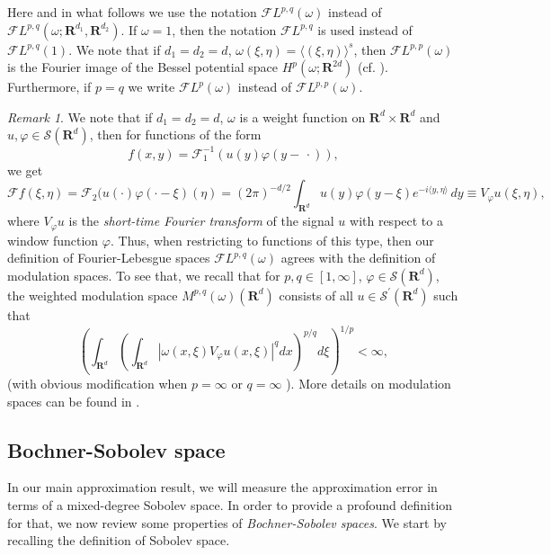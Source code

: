 \documentclass[a4paper]{article}
\newcommand{\rr}[1]{\mathbf{R}^{#1}}
\newcommand{\rrI}{\rr{d_1}}
\newcommand{\rrII}{\rr{d_2}}
\newcommand{\scal}[2]{\langle #1,#2\rangle}
\newcommand{\eabs}[1]{\langle #1\rangle}     %
\numberwithin{equation}{section}
\theoremstyle{remark}
\newtheorem{remark}[theorem]{Remark}
\begin{document}
Here and in what follows we use the notation
$\mathscr F L^{p, q}(\omega)$ instead of
$\mathscr F L^{p, q}(\omega; \rrI,\rrII)$.
If $\omega =1$, then the notation $\mathscr FL^{p, q}$
is used instead of $\mathscr FL^{p, q}(1 )$.
We note that if $d_1=d_2 = d$,
$\omega (\xi , \eta)=\eabs {(\xi, \eta)} ^s$,
then
$\mathscr{F}L^{p, p}(\omega )$ is the Fourier image of the Bessel potential space
$H^p(\omega ; \rr{2d})$
(cf. \cite{Bergh76InterpolationSpacesIntroduction}).
Furthermore, if $p=q$ we write $\mathscr F L^{p}(\omega)$
instead of $\mathscr F L^{p, p}(\omega)$.

\begin{remark}
\label{rem:modulation_space}
    We note that if $d_1=d_2=d$, $\omega$ is a weight function on $\rr{d}\times\rr{d}$
    and $u, \varphi\in \mathscr{S}(\rr{d})$,
    then for functions of the form
    \[
        f(x,y) = \mathscr{F}_1^{-1}(u(y )\varphi(y-\,\cdot)),
    \]
    we get
    $$
    \mathscr{F} f(\xi,\eta) = \mathscr{F}_2(u(\cdot)\varphi(\cdot-\xi)(\eta)
    =
    (2\pi )^{-{d}/2}
        \int _{\rr{d}} u(y)\varphi(y-\xi)e^{-i\scal  y\eta }\, dy
        \equiv V_\varphi u(\xi, \eta),
    $$
    where $V_\varphi u$ is the \emph{short-time Fourier transform}
    of the signal $u$ with respect to a window function $\varphi $.
    Thus, when restricting to functions of this type, then our definition of Fourier-Lebesgue spaces $\mathscr{F}L^{p,q}(\omega)$
    agrees with the definition of modulation spaces. 
    To see that, we recall that for $p,q\in [1,\infty]$,
    $\varphi\in \mathscr{S}(\rr{d})$,
    the weighted modulation space
    $M^{p, q}(\omega)\left(\mathbf{R}^d\right)$ consists of all
    $u \in \mathscr{S}^{\prime}\left(\mathbf{R}^d\right)$
    such that
    $$
    \left(\int_{\rr{d}}\left(\int_{\rr{d}}
        \left|\omega(x, \xi)V_{\varphi}u(x,\xi)\right|^q
            d x\right)^{p / q}
            d \xi\right)^{1 / p}<\infty,
    $$
    (with obvious modification when $p=\infty$ or $q=\infty$ ).
    More details on modulation spaces can be found in 
    \cite{Grochenig01FoundationsTimeFrequencyAnalysis}.
\end{remark}

\subsection{Bochner-Sobolev space}\label{sec:Bochner_Sobolev_space}
In our main approximation result, we will measure the approximation error in terms of a mixed-degree Sobolev space.
In order to provide a profound definition for that,
we now review some properties of \emph{Bochner-Sobolev spaces}.
We start by recalling the definition of Sobolev space.
\end{document}
